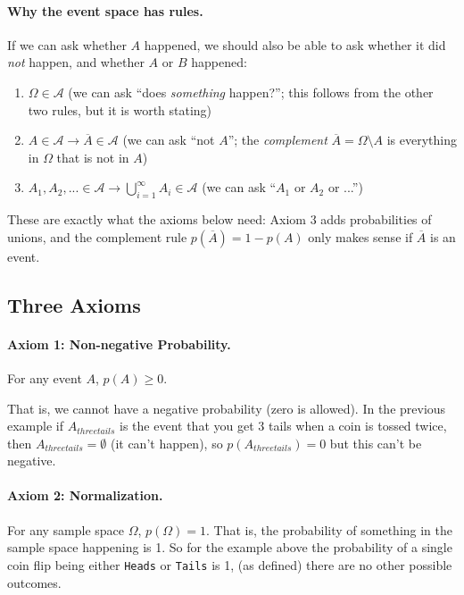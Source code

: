 \paragraph{Why the event space has rules.}
If we can ask whether $A$ happened, we should also be able to ask whether it did \emph{not} happen, and whether $A$ or $B$ happened:
\begin{enumerate}
\item $\Omega\in\mathcal{A}$ \quad (we can ask ``does \emph{something} happen?''; this follows from the other two rules, but it is worth stating)
\item $A\in\mathcal{A} \rightarrow \overline{A}\in\mathcal{A}$ \quad (we can ask ``not $A$''; the \emph{complement} $\overline{A}=\Omega\setminus A$ is everything in $\Omega$ that is not in $A$)
\item $A_1,A_2,... \in \mathcal{A} \rightarrow \bigcup_{i=1}^\infty A_i \in \mathcal{A}$ \quad (we can ask ``$A_1$ or $A_2$ or ...'')
\end{enumerate}
These are exactly what the axioms below need: Axiom 3 adds probabilities of unions, 
and the complement rule $p(\overline{A})=1-p(A)$ only makes sense if $\overline{A}$ is an event. 

\subsection{Three Axioms}

\paragraph{Axiom 1: Non-negative Probability.}
For any event $A$, $p(A)\ge 0$.

That is, we cannot have a negative probability (zero is allowed).
In the previous example if $A_{threetails}$ is the event that you get 3 tails when a coin is tossed twice,
then $A_{threetails}=\emptyset$ (it can't happen), so $p(A_{threetails})=0$ but this can't be negative.

\paragraph{Axiom 2: Normalization.}
For any sample space $\Omega$, $p(\Omega)=1$. 
That is, the probability of something in the sample space happening is 1. 
So for the example above the probability of a single coin flip being either \texttt{Heads} or \texttt{Tails} is 1, 
(as defined) there are no other possible outcomes. 


